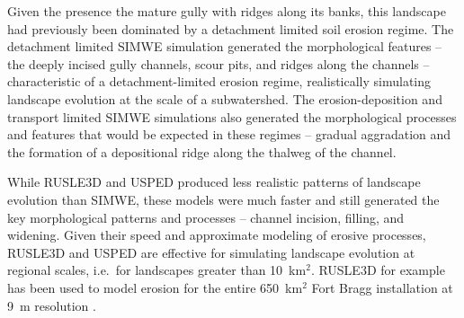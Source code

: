 \documentclass[gmd, manuscript]{copernicus}
\begin{document}
Given the presence the mature gully 
with ridges along its banks,
this landscape had previously been dominated by 
a detachment limited soil erosion regime.
%
The detachment limited SIMWE simulation 
generated the morphological features
-- the deeply incised gully channels, 
scour pits,
and ridges along the channels 
--
characteristic of a detachment-limited erosion regime,
realistically simulating landscape evolution 
at the scale of a subwatershed. 
%
The erosion-deposition and transport limited 
SIMWE simulations also generated 
the morphological processes and features
that would be expected in these regimes
-- gradual aggradation
and the formation of a depositional ridge 
along the thalweg of the channel.

While RUSLE3D and USPED
produced less realistic patterns of landscape evolution
than SIMWE,
these models were much faster and still generated
the key morphological patterns and processes -- 
channel incision, filling, and widening. 
%
Given their speed
and approximate modeling of erosive processes, 
RUSLE3D and USPED 
are effective for simulating landscape evolution
at regional scales, 
i.e.~for landscapes greater than 10~\unit{km}$^{2}$. 
%
RUSLE3D for example has been used to
model erosion for the entire 650~\unit{km}$^{2}$ 
Fort Bragg installation at 9~\unit{m} resolution
\citep{Levine2018}. 



\end{document}
